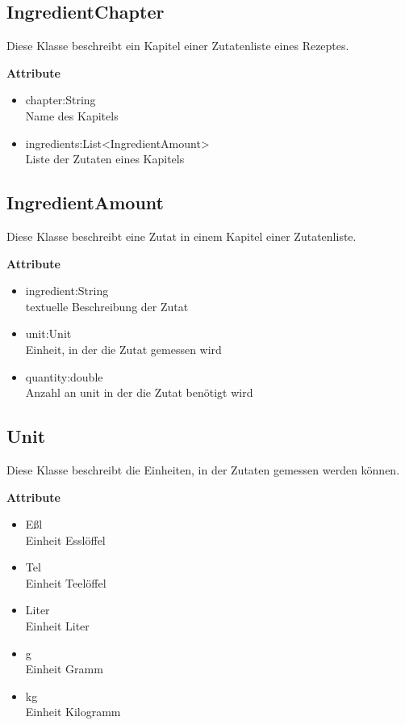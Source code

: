 \subsection{IngredientChapter}
Diese Klasse beschreibt ein Kapitel einer Zutatenliste eines Rezeptes.

\textbf{Attribute}
\begin{itemize}[nosep]
	\item chapter:String \\ Name des Kapitels
	\item ingredients:List<IngredientAmount> \\ Liste der Zutaten eines Kapitels
\end{itemize}

\subsection{IngredientAmount}
Diese Klasse beschreibt eine Zutat in einem Kapitel einer Zutatenliste.

\textbf{Attribute}
\begin{itemize}[nosep]
	\item ingredient:String \\ textuelle Beschreibung der Zutat
	\item unit:Unit \\ Einheit, in der die Zutat gemessen wird
	\item quantity:double \\ Anzahl an unit in der die Zutat benötigt wird
\end{itemize}

\subsection{Unit}
Diese Klasse beschreibt die Einheiten, in der Zutaten gemessen werden können.

\textbf{Attribute}
\begin{itemize}[nosep]
	\item Eßl \\ Einheit Esslöffel
	\item Tel \\ Einheit Teelöffel
	\item Liter \\ Einheit Liter
	\item g \\ Einheit Gramm
	\item kg \\ Einheit Kilogramm
\end{itemize}

